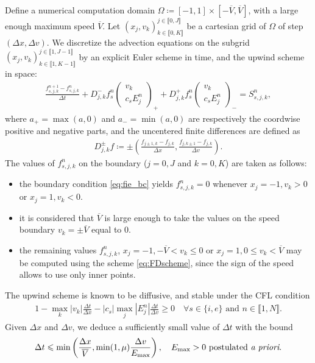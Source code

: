 \documentclass{article}
\numberwithin{equation}{section}
\newcommand{\todo}[1]{{\color{red}\textbf{#1}}}
\newcommand{\vv}[1]{\begin{pmatrix} #1 \end{pmatrix}} %
\begin{document}
Define a numerical computation domain $\Omega \coloneqq [-1,1] \times [-\overline{V},\overline{V}]$, with a large enough maximum speed $\overline{V}$. Let $(x_j, v_k)^{j\in\llbracket0,J\rrbracket}_{k\in\llbracket0,K\rrbracket}$ be a cartesian grid of $\Omega$ of step $(\Delta x, \Delta v)$. We discretize the advection equations on the subgrid $(x_j, v_k)^{j\in\llbracket1,J-1\rrbracket}_{k\in\llbracket1,K-1\rrbracket}$ by an explicit Euler scheme in time, and the upwind scheme in space:
\begin{align}\label{eq:FDscheme}
	\frac{f_{s,j,k}^{n+1} - f_{s,j,k}^{n}}{\Delta t} + D^-_{j,k} f_s^n \vv{v_k\\c_s E_j^n}_{+} +D^+_{j,k} f_s^n \vv{v_k\\c_s E_j^n}_{-} = S_{s,j,k}^n,
\end{align}
where $a_+ = \max(a,0)$ and $a_{-} = \min(a,0)$ are respectively the coordwise positive and negative parts, and the uncentered finite differences are defined as
\begin{align*}
	D^{\pm}_{j,k} f \coloneqq \pm \left(\frac{f_{j\pm 1,k} - f_{j,k}}{\Delta x}, \frac{f_{j,k\pm 1} - f_{j,k}}{\Delta v}\right).
\end{align*}
The values of $f_{s,j,k}^n$ on the boundary ($j=0, J$ and $k=0, K$) are taken as follows:
\begin{itemize}
\item the boundary condition \cref{eq:fie_bc} yields $f_{s,j,k}^n = 0$ whenever $x_j=-1, v_k > 0$ or $x_j=1, v_k < 0$.
\item it is considered that $\overline{V}$ is large enough to take the values on the speed boundary $v_k = \pm \overline{V}$ equal to 0.
\item the remaining values $f_{s,j,k}^n$, $x_j=-1, -\overline{V} < v_k \leqslant 0$ or $x_j=1, 0 \leqslant v_k < \overline{V}$ may be computed using the scheme \cref{eq:FDscheme}, since the sign of the speed allows to use only inner points.
\end{itemize}


\noindent The upwind scheme is known to be diffusive, and stable under the CFL condition 
\begin{align*}
	1 - \max_{k} |v_k| \frac{\Delta t}{\Delta x} - |c_s| \max_{j} |E^n_j| \frac{\Delta t}{\Delta v} \geqslant 0 \quad \forall s \in \{i,e\}\text{ and } n \in \llbracket1,N\rrbracket.
\end{align*}
Given $\Delta x$ and $\Delta v$, we deduce a sufficiently small value of $\Delta t$ with the bound
\begin{align*}
	\Delta t \leqslant \min\left(\frac{\Delta x}{\overline{V}}, \min(1,\mu)\frac{\Delta v}{E_{\text{max}}}\right), \quad E_{\text{max}}>0 \text{ postulated \emph{a priori}.}
\end{align*}
\end{document}
